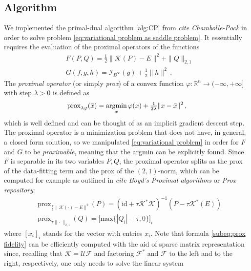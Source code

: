 \documentclass[journal,twoside,web]{ieeecolor}
\newcommand{\R}{\mathbb{R}}
\DeclareMathOperator*{\argmin}{\text{\rm{argmin}}}
\begin{document}
\subsection{Algorithm}
We implemented the primal-dual algorithm \eqref{alg:CP} from \textit{cite Chambolle-Pock} in order to solve problem \eqref{eq:variational problem as saddle problem}. It essentially requires the evaluation of the proximal operators of the functions
\begin{align*}
    & F(P,Q) = \tfrac{1}{2} \| \mathcal{K}(P)-E\|^2 + \| Q \|_{2,1} \\
    & G(f,g,h) = \mathcal{I}_{B^\infty}(g) + \tfrac{1}{2}\|h\|^2 \, .
\end{align*}
The \textit{proximal operator} (or simply \textit{prox}) of a convex function $\varphi:\R^n \to (-\infty,+\infty]$ with step $\lambda > 0 $ is defined as
\begin{align*}
    \mathrm{prox}_{\lambda \varphi}(\bar{x}) = \argmin_x \varphi(x) + \tfrac{1}{2\lambda}\|x-\bar{x}\|^2 \, ,
\end{align*}
which is well defined and can be thought of as an implicit gradient descent step. The proximal operator is a minimization problem that does not have, in general, a closed form solution, so we manipulated \eqref{eq:variational problem} in order for $F$ and $G$ to be \textit{proximable}, meaning that the argmin can be explicitly found. Since $F$ is separable in its two variables $P,Q$, the proximal operator splits as the prox of the data-fitting term and the prox of the $(2,1)$-norm, which can be computed for example as outlined in \textit{cite Boyd's Proximal algorithms} or \textit{Prox repository}:
\begin{subequations}
\begin{alignat}{2}
\label{subeq:prox fidelity}
    & \mathrm{prox}_{\tfrac{\tau}{2}\|\mathcal{K}(\cdot)-E\|^2}(P)
    = (\mathrm{id}+\tau \mathcal{K}^*\mathcal{K})^{-1}(P-\tau \mathcal{K}^*(E)) \\
    & \mathrm{prox}_{\tau\|\cdot\|_{2,1}}(Q) = \big[ \mathrm {max}\{ |Q_i|-\tau, 0 \} \big]_i
\end{alignat}
\end{subequations}
where $[x_i]_i$ stands for the vector with entries $x_i$. Note that formula \eqref{subeq:prox fidelity} can be efficiently computed with the aid of sparse matrix representation since, recalling that $\mathcal{K}=\mathcal{UF}$ and factoring $\mathcal{F}^*$ and $\mathcal{F}$ to the left and to the right, respectively, one only needs to solve the linear system
\end{document}
